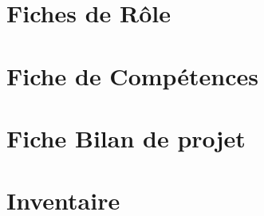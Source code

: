 \documentclass[asi]{picINSA}
\begin{document}
\begin{appendix}
\chapter{Fiches de Rôle}
\label{annexeFRo}
	

\chapter{Fiche de Compétences}
\label{annexeFC}


\chapter{Fiche Bilan de projet}


\chapter{Inventaire}
\label{annexeInventaire}

	
\listoffigures
{}
	 
\listoftables
{}
\end{appendix}
\pageQuatriemeCouverture
\end{document}
